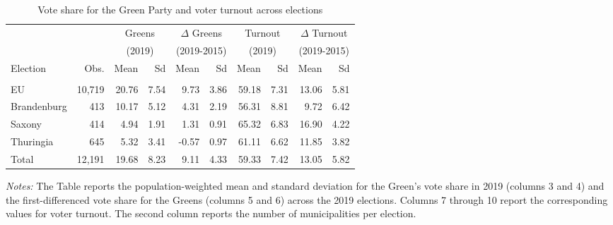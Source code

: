 
	\begin{table}[H]\centering
		\begin{threeparttable}
			\caption{Vote share for the Green Party and voter turnout across elections}
			\label{tab_greta_cons:data_greens_vote_share}
			\begin{tabular}{l*{9}{r}}
				\toprule
				&&\multicolumn{2}{c}{Greens}&\multicolumn{2}{c}{$\Delta$ Greens}&\multicolumn{2}{c}{Turnout}&\multicolumn{2}{c}{$\Delta$ Turnout}\\
				&&\multicolumn{2}{c}{(2019)}&\multicolumn{2}{c}{(2019-2015)}&\multicolumn{2}{c}{(2019)}&\multicolumn{2}{c}{(2019-2015)}\\
				\cmidrule(lr){3-4}\cmidrule(lr){5-6}\cmidrule(lr){7-8}\cmidrule(lr){9-10}
				Election		&	Obs.	&	Mean		&	Sd		&	Mean	& Sd	&	Mean	&	Sd		&	Mean	& Sd		\\
				\midrule\\
				EU				&	10,719	&	20.76		&	7.54	&	9.73	& 3.86	&	59.18	&	7.31	&	13.06	&	5.81	\\
				Brandenburg		&	413		&	10.17		&	5.12	&	4.31	& 2.19	&	56.31	&	8.81	&	9.72	&	6.42	\\
				Saxony			&	414		&	4.94		&	1.91	&	1.31	& 0.91	&	65.32	&	6.83	&	16.90	&	4.22	\\
				Thuringia		&	645		&	5.32		&	3.41	&	-0.57	& 0.97	&	61.11	&	6.62	&	11.85	&	3.82	\\
				\midrule
				Total			&	12,191	&	19.68		&	8.23	&	9.11	& 4.33	&	59.33	&	7.42	&	13.05	&	5.82	\\
				\bottomrule
			\end{tabular}
			\begin{tablenotes} 
				\item \scriptsize \emph{Notes:} The Table reports the population-weighted mean and standard deviation for the Green's vote share in 2019 (columns 3 and 4) and the first-differenced vote share for the Greens (columns 5 and 6) across the 2019 elections. Columns 7 through 10 report the corresponding values for voter turnout. The second column reports the number of municipalities per election. 
			\end{tablenotes} 
		\end{threeparttable}
	\end{table}

